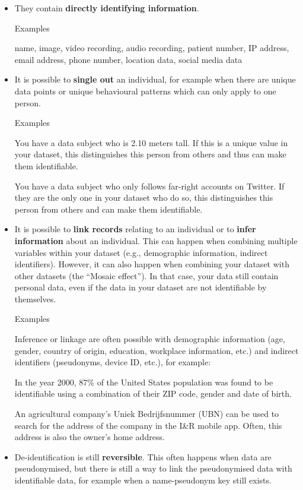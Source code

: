 \documentclass[
]{book}
\providecommand{\tightlist}{%
  \setlength{\itemsep}{0pt}\setlength{\parskip}{0pt}}
\begin{document}
\begin{itemize}
\tightlist
\item
  They contain \textbf{directly identifying information}.

  Examples

  name, image, video recording, audio recording, patient number, IP address,
  email address, phone number, location data, social media data
\item
  It is possible to \textbf{single out} an individual, for example when there are
  unique data points or unique behavioural patterns which can only apply to one
  person.

  Examples

  You have a data subject who is 2.10 meters tall. If this is a unique
  value in your dataset, this distinguishes this person from others and thus
  can make them identifiable.

  You have a data subject who only follows far-right accounts on Twitter.
  If they are the only one in your dataset who do so, this distinguishes this
  person from others and can make them identifiable.
\item
  It is possible to \textbf{link records} relating to an individual or to
  \textbf{infer information} about an individual. This can happen when combining
  multiple variables within your dataset (e.g., demographic information, indirect
  identifiers). However, it can also happen when combining your dataset with other
  datasets (the ``Mosaic effect''). In that case, your data still contain personal
  data, even if the data in your dataset are not identifiable by themselves.

  Examples

  Inference or linkage are often possible with demographic information (age,
  gender, country of origin, education, workplace information, etc.) and
  indirect identifiers (pseudonyms, device ID, etc.), for example:

  In the year 2000, 87\% of the United States population
  was found to be identifiable using a combination of their ZIP code, gender
  and date of birth.

  An agricultural company's Uniek Bedrijfsnummer (UBN) can be used to
  search for the address of the company in the
  I\&R mobile app.
  Often, this address is also the owner's home address.
\item
  De-identification is still \textbf{reversible}. This often happens when data are
  pseudonymised, but there is still a way to link the pseudonymised data with
  identifiable data, for example when a name-pseudonym key still exists.
\end{itemize}
\end{document}
